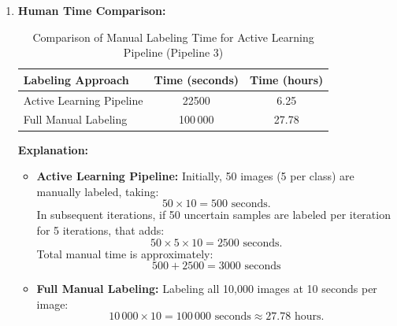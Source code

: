 \documentclass[12pt]{article}
\begin{document}
\begin{enumerate}
    \item \textbf{Human Time Comparison:}
    \begin{table}[h!]
        \centering
        \begin{tabular}{|l|c|c|}
        \hline
        \textbf{Labeling Approach} & \textbf{Time (seconds)} & \textbf{Time (hours)} \\ \hline
        Active Learning Pipeline   & 22500  & 6.25 \\ \hline
        Full Manual Labeling       & 100\,000 & 27.78 \\ \hline
        \end{tabular}
        \caption{Comparison of Manual Labeling Time for Active Learning Pipeline (Pipeline 3)}
        \label{tab:manual_labeling_time_p3}
    \end{table}
    
    \noindent
    \newpage
    \textbf{Explanation:} 
    \begin{itemize}
        \item \textbf{Active Learning Pipeline:}  
        Initially, 50 images (5 per class) are manually labeled, taking:
        \[
        50 \times 10 = 500 \text{ seconds}.
        \]
        In subsequent iterations, if 50 uncertain samples are labeled per iteration for 5 iterations, that adds:
        \[
        50 \times 5 \times 10 = 2500 \text{ seconds}.
        \]
        Total manual time is approximately:
        \[
        500 + 2500 = 3000 \text{ seconds} 
        \]
        \item \textbf{Full Manual Labeling:}  
        Labeling all 10,000 images at 10 seconds per image:
        \[
        10\,000 \times 10 = 100\,000 \text{ seconds} \approx 27.78 \text{ hours}.
        \]
    \end{itemize}
\end{enumerate}
\end{document}
